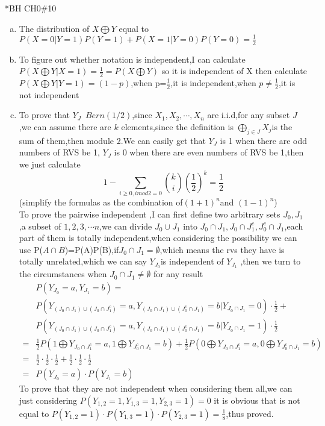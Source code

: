 \documentclass{article}
\begin{document}
\begin{homeworkProblem}*{BH CH0\#10}
	\begin{enumerate}[(a)]
		\item The distribution of $X\bigoplus Y$ equal to $P(X=0|Y=1)P(Y=1)+P(X=1|Y=0)P(Y=0)=\frac{1}{2}$
		\item To figure out whether notation is independent,I can calculate $P(X\bigoplus Y|X=1)=\frac{1}{2}=P(X\bigoplus Y)$ so it is independent of X 
		then calculate $P(X\bigoplus Y|Y=1)=(1-p)$,when p=$\frac{1}{2}$,it is independent,when $p\neq\frac{1}{2}$,it is not independent
	\item To prove that $Y_J$~$Bern(1/2)$,since $X_1,X_2,\cdots,X_n$ are i.i.d,for any subset $J$,we can assume there are $k$ elements,since the definition is $\bigoplus\limits_{j\in J}X_j$is the sum of them,then module 2.We can easily get that $Y_J$ is 1 when there are odd numbers of RVS be 1, $Y_J$ is 0 when there are even numbers of RVS be 1,then we just calculate $$1-\sum\limits_{i\geq 0,i mod 2=0}\binom{k}{i}(\frac{1}{2})^k=\frac{1}{2}$$(simplify the formulas as the combination of$(1+1)^n$and $(1-1)^n$)
	\\To prove the pairwise independent ,I can first define two arbitrary sets $J_0,J_1$,a subset of ${1,2,3,\cdots n}$,we can divide $J_0\cup J_1$ into $J_0\cap J_1,J_0\cap J_1^c,J_0^c\cap J_1$,each part of them is totally independent,when considering the possibility we can use P($A\cap B$)=P(A)P(B),if$J_0\cap J_1=\emptyset$,which means the rvs they have is totally unrelated,which we can say $Y_{J_0}$is independent of $Y_{J_1}$ ,then we turn to the circumstances when $J_0\cap J_1\neq \emptyset$
for any result  $$\begin{aligned}
	&P(Y_{J_0}=a,Y_{J_1}=b)=
	\\&P(Y_{(J_0\cap J_1)\cup(J_0\cap J_1^c)}=a,Y_{(J_0\cap J_1)\cup(J_0^c\cap J_1)}=b|Y_{J_0\cap J_1}=0)\cdot\frac{1}{2}+\\&P(Y_{(J_0\cap J_1)\cup(J_0\cap J_1^c)}=a,Y_{(J_0\cap J_1)\cup(J_0^c\cap J_1)}=b|Y_{J_0\cap J_1}=1)\cdot \frac{1}{2}
	\\=&\frac{1}{2} P(1\bigoplus Y_{J_0\cap J_1^c}=a,1\bigoplus Y_{J_0^c\cap J_1}=b)+\frac{1}{2} P(0\bigoplus Y_{J_0\cap J_1^c}=a,0\bigoplus Y_{J_0^c\cap J_1}=b)
	\\=&\frac{1}{2}\cdot\frac{1}{2}\cdot \frac{1}{2}+\frac{1}{2}\cdot\frac{1}{2}\cdot \frac{1}{2}
	\\=&P(Y_{J_0}=a)\cdot P(Y_{J_1}=b)
\end{aligned}$$
To prove that they are not independent when considering them all,we can just considering $P(Y_{{1,2}}=1,Y_{{1,3}}=1,Y_{{2,3}}=1)=0$ it is obvious that is not equal to $P(Y_{{1,2}}=1)\cdot P(Y_{{1,3}}=1)\cdot P(Y_{{2,3}}=1)=\frac{1}{8}$,thus proved.
\end{enumerate}
\end{homeworkProblem}
\end{document}
